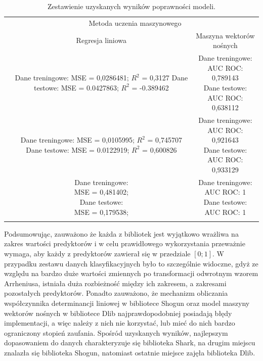 \begin{longtable}{c | c | c }
	\centering
	\multirow{2}{*}{\makecell{Biblioteka}} & \multicolumn{2}{c}{Metoda uczenia maszynowego} \\
	\cline{2-3}
	& Regresja liniowa & Maszyna wektorów nośnych \\
	\hline
	\makecell{Shogun} & \makecell{Dane treningowe: \\ MSE = 0,0286481; $R^2$ = 0,3127 \\ Dane testowe: \\ MSE = 0.0427863; $R^2$ = -0.389462} & \makecell{Dane treningowe: \\ AUC ROC: 0,789143 \\ Dane testowe: \\ AUC ROC: 0,638112} \\
	\hline
	\makecell{Shark} & \makecell{Dane treningowe: \\ MSE = 0,0105995; $R^2$ = 0,745707 \\ Dane testowe: \\ MSE = 0.0122919; $R^2$ = 0,600826} & \makecell{Dane treningowe: \\ AUC ROC: 0,921643 \\ Dane testowe: \\ AUC ROC: 0,933129} \\
	\hline
	\makecell{Dlib} & \makecell{Dane treningowe: \\ MSE = 0,481402; \\ Dane testowe: \\ MSE = 0,179538; } & \makecell{Dane treningowe: \\ AUC ROC: 1 \\ Dane testowe: \\ AUC ROC: 1} \\
	\caption{Zestawienie uzyskanych wyników poprawności modeli.}
	\label{tab:models2}
\end{longtable} 

Podsumowując, zauważono że każda z bibliotek jest wyjątkowo wrażliwa na zakres wartości predyktorów i w celu prawidłowego wykorzystania przeważnie wymaga, aby każdy z predyktorów zawierał się w przedziale $[0; 1]$. W przypadku zestawu danych klasyfikacyjnych było to szczególnie widoczne, gdyż ze względu na bardzo duże wartości zmiennych po transformacji odwrotnym wzorem Arrheniusa, istniała duża rozbieżność między ich zakresem, a zakresami pozostałych predyktorów. Ponadto zauważono, że mechanizm obliczania współczynnika determinancji liniowej w bibliotece Shogun oraz model maszyny wektorów nośnych w bibliotece Dlib najprawdopodobniej posiadają błędy implementacji, a więc należy z nich nie korzystać, lub mieć do nich bardzo ograniczony stopień zaufania. Spośród uzyskanych wyników, najlepszym dopasowaniem do danych charakteryzuje się biblioteka Shark, na drugim miejscu znalazła się biblioteka Shogun, natomiast ostatnie miejsce zajęła biblioteka Dlib.



